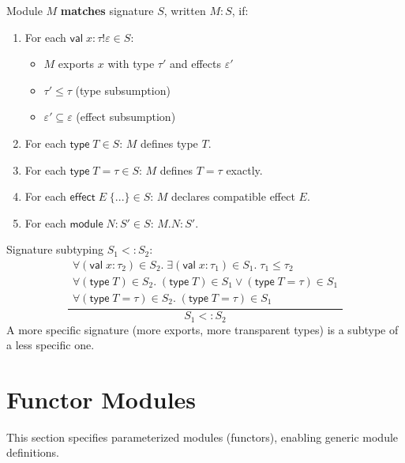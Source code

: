 \begin{definition}
\label{def:sig-matching}
Module $M$ \textbf{matches} signature $S$, written $M : S$, if:
\begin{enumerate}
  \item For each $\mathsf{val}\; x : \tau \mathbin{!} \varepsilon \in S$:
    \begin{itemize}
      \item $M$ exports $x$ with type $\tau'$ and effects $\varepsilon'$
      \item $\tau' \leq \tau$ (type subsumption)
      \item $\varepsilon' \subseteq \varepsilon$ (effect subsumption)
    \end{itemize}
  \item For each $\mathsf{type}\; T \in S$: $M$ defines type $T$.
  \item For each $\mathsf{type}\; T = \tau \in S$: $M$ defines $T = \tau$ exactly.
  \item For each $\mathsf{effect}\; E\; \{...\} \in S$: $M$ declares compatible effect $E$.
  \item For each $\mathsf{module}\; N : S' \in S$: $M.N : S'$.
\end{enumerate}
\end{definition}

\begin{definition}
\label{def:sig-subtyping}
Signature subtyping $S_1 <: S_2$:
\[
\frac{
  \begin{array}{c}
  \forall (\mathsf{val}\; x : \tau_2) \in S_2.\; \exists (\mathsf{val}\; x : \tau_1) \in S_1.\; \tau_1 \leq \tau_2 \\
  \forall (\mathsf{type}\; T) \in S_2.\; (\mathsf{type}\; T) \in S_1 \lor (\mathsf{type}\; T = \tau) \in S_1 \\
  \forall (\mathsf{type}\; T = \tau) \in S_2.\; (\mathsf{type}\; T = \tau) \in S_1
  \end{array}
}{S_1 <: S_2}
\]
A more specific signature (more exports, more transparent types) is a subtype of a less specific one.
\end{definition}

\section{Functor Modules}
\label{sec:functor-modules}

This section specifies parameterized modules (functors), enabling generic module definitions.

